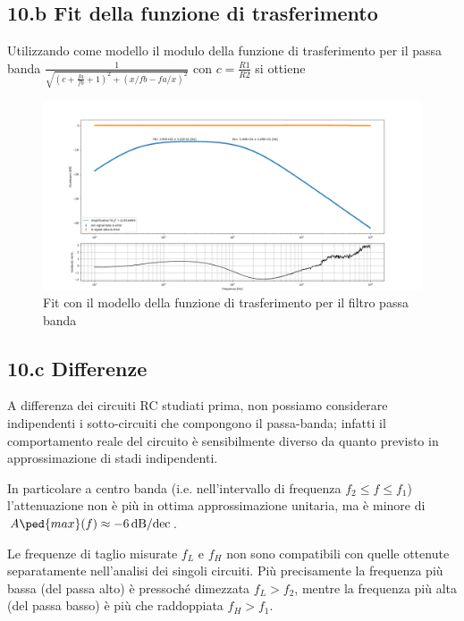 \documentclass[10pt,a4paper]{article}
\begin{document}
\subsection*{10.b Fit della funzione di trasferimento}
Utilizzando come modello il modulo della funzione di trasferimento per il passa banda $\frac{1}{\sqrt{(c + \frac{fa}{fb} + 1)^2 + (x/fb - fa/x)^2}}$ con $c=\frac{R1}{R2}$ si ottiene

\begin{figure}[htb]
\centering
\includegraphics[scale=0.35]{passa_banda}
\caption{Fit con il modello della funzione di trasferimento per il filtro
passa banda}
\end{figure}

\subsection*{10.c Differenze}
A differenza dei circuiti RC studiati prima, non possiamo considerare
indipendenti i sotto-circuiti che compongono il passa-banda; infatti il
comportamento reale del circuito è sensibilmente diverso da quanto previsto in 
approssimazione di stadi indipendenti.

In particolare a centro banda (i.e. nell'intervallo di frequenza
$f_2 \leq f \leq f_1$) l'attenuazione non è più in ottima approssimazione
unitaria, ma è minore di $A\ped{max}(f) \approx \SI{-6}{\dB/dec}$.

Le frequenze di taglio misurate $f_L$ e $f_H$ non sono compatibili con quelle
ottenute separatamente nell'analisi dei singoli circuiti. Più precisamente
la frequenza più bassa (del passa alto) è pressoché dimezzata
$f_L > f_2$, mentre la frequenza più alta (del passa basso) è più che
raddoppiata $f_H > f_1$.
\end{document}

